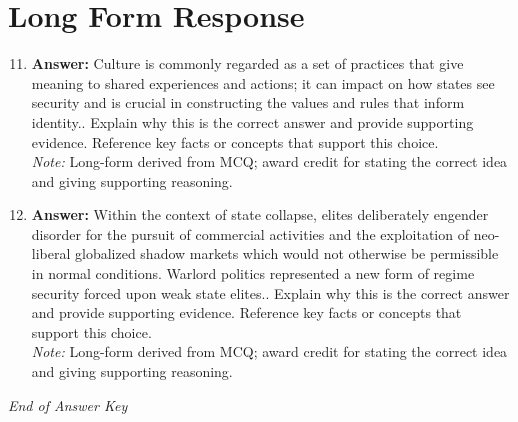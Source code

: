 \documentclass[12pt]{article}
\begin{document}
\section*{Long Form Response}
\begin{enumerate}[label=\arabic*.]
\setcounter{enumi}{10}
\item \textbf{Answer:} Culture is commonly regarded as a set of practices that give meaning to shared experiences and actions; it can impact on how states see security and is crucial in constructing the values and rules that inform identity.. Explain why this is the correct answer and provide supporting evidence. Reference key facts or concepts that support this choice.
\\ \textit{Note:} Long-form derived from MCQ; award credit for stating the correct idea and giving supporting reasoning.
\item \textbf{Answer:} Within the context of state collapse, elites deliberately engender disorder for the pursuit of commercial activities and the exploitation of neo-liberal globalized shadow markets which would not otherwise be permissible in normal conditions. Warlord politics represented a new form of regime security forced upon weak state elites.. Explain why this is the correct answer and provide supporting evidence. Reference key facts or concepts that support this choice.
\\ \textit{Note:} Long-form derived from MCQ; award credit for stating the correct idea and giving supporting reasoning.
\end{enumerate}

\vfill
\noindent\textit{End of Answer Key}
\end{document}
